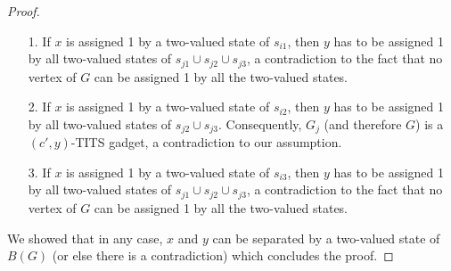 \documentclass[%
12pt,
prereprint,
showpacs,
showkeys,
preprintnumbers,
amsmath,amssymb,
aps,
pra,
longbibliography,
notitlepage
]{revtex4-1}
\theoremstyle{definition}
\begin{document}
\begin{proof}
\begin{itemize}
\begin{itemize}
                                        \begin{itemize}
                                                \item[1.] If $x$ is assigned 1 by a two-valued state of $s_{i1}$, then $y$ has to be assigned 1 by all two-valued states of $s_{j1}\cup s_{j2}\cup s_{j3}$, a contradiction to the fact that no vertex of $G$ can be assigned 1 by all the two-valued states.
                                                \item[2.] If $x$ is assigned 1 by a two-valued state of $s_{i2}$, then $y$ has to be assigned 1 by all two-valued states of $s_{j2}\cup s_{j3}$. Consequently, $G_j$ (and therefore $G$) is a $(c',y)$-TITS gadget, a contradiction to our assumption.
                                                \item[3.] If $x$ is assigned 1 by a two-valued state of $s_{i3}$, then $y$ has to be assigned 1 by all two-valued states of $s_{j1}\cup s_{j2}\cup s_{j3}$, a contradiction to the fact that no vertex of $G$ can be assigned 1 by all the two-valued states.
                                        \end{itemize}

                        \end{itemize}
                \end{itemize}


                We showed that in any case, $x$ and $y$ can be separated by a two-valued state of $B(G)$ (or else there is a contradiction) which concludes the proof.
        \end{proof}
\end{document}
